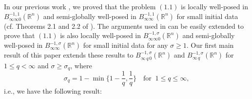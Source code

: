 \documentclass[11pt]{article}
\begin{document}
  In our previous work \cite{Cui}, we proved that the problem $(1.1)$ is locally well-posed in $B^{-1,1}_{\infty\infty 0}(\mathbb{R}^n)$ and
  semi-globally well-posed in $B^{-1,1}_{\infty\infty}(\mathbb{R}^n)$ for small initial data (cf. Theorems 2.1 and 2.2 of \cite{Cui}). The arguments
  used in \cite{Cui} can be easily extended to prove that $(1.1)$ is also locally well-posed in $B^{-1,\sigma}_{\infty\infty 0}(\mathbb{R}^n)$ and
  semi-globally well-posed in $B^{-1,\sigma}_{\infty\infty}(\mathbb{R}^n)$ for small initial data for any $\sigma\geqslant 1$. Our first main result
  of this paper extends these results to $B^{-1,\sigma}_{\infty\,q\,0}(\mathbb{R}^n)$ and $B^{-1,\sigma}_{\infty\,q}(\mathbb{R}^n)$ for $1\leqslant q<
  \infty$ and $\sigma\geqslant\sigma_q$, where
$$
  \sigma_q=1-\min\Big\{1-\frac{1}{q},\frac{1}{q}\Big\} \quad \mbox{for}\;\; 1\leqslant q\leqslant\infty,
$$
  i.e., we have the following result:
\medskip
\end{document}
